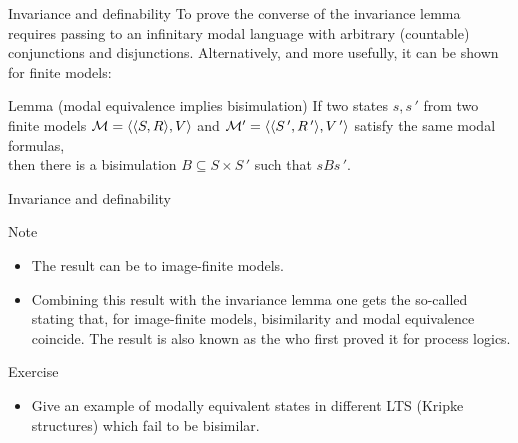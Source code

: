 \documentclass[aspectratio=169]{beamer}
\begin{document}
\begin{slide}{Invariance and definability}\label{s:33}
\small
To prove the converse of the invariance lemma requires passing to an \alert{infinitary} modal language  with arbitrary (countable) conjunctions and disjunctions. Alternatively, and more usefully, it can be shown  for \alert{finite} models:
\begin{block}{Lemma (modal equivalence implies bisimulation)}
\alert{If} two states $s, s\,'$ from two finite models $\mathcal{M} = \langle \langle S, R \rangle, V \rangle$ and $\mathcal{M}' = \langle \langle S\,', R\,' \rangle, V\,' \rangle$ satisfy the same modal formulas,
\\
\alert{then} there is a bisimulation $B \subseteq S \times S\,'$  such that $s B s\,'$.
 \end{block}
\end{slide}

\begin{slide}{Invariance and definability}\label{s:34}
\small
\begin{block}{Note}
\begin{itemize}
\item The result can be  to \alert{image-finite} models.
\item Combining this result with the invariance lemma one gets the so-called  stating that, for image-finite models, bisimilarity and modal equivalence coincide. The result is also known as the  who first proved it for process logics.
\end{itemize}
\end{block}

\begin{exampleblock}{Exercise}
\begin{itemize}
\item Give an example of modally equivalent states in different LTS (Kripke structures) which fail to be bisimilar.
\end{itemize}
\end{exampleblock}
\end{slide}
\end{document}
